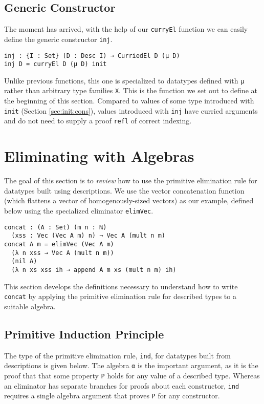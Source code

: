 \documentclass[preprint,nonatbib]{sigplanconf}
\newcommand{\refsec}[1]{Section \ref{sec:#1}}
\begin{document}
\subsection{Generic Constructor}

The moment has arrived, with the help of our {\tt curryEl} function we
can easily define the generic constructor {\tt inj}.

\begin{verbatim}
inj : {I : Set} (D : Desc I) → CurriedEl D (μ D)
inj D = curryEl D (μ D) init
\end{verbatim}

Unlike previous functions, this one is specialized to datatypes
defined with {\tt μ} rather than arbitrary type families {\tt X}. This
is the function we set out to define at the beginning of this section.
Compared to values of some type introduced with {\tt init} (\refsec{init:cons}),
values introduced with {\tt inj} have curried arguments and do not
need to supply a proof {\tt refl} of correct indexing.

\section{Eliminating with Algebras}
\label{sec:ind}

The goal of this section is to {\it review} how to use the primitive
elimination rule for datatypes built using descriptions. We use
the vector concatenation function (which flattens a vector of
homogenously-sized vectors) as our example, defined below using the
specialized eliminator {\tt elimVec}.

\begin{verbatim}
concat : (A : Set) (m n : ℕ)
  (xss : Vec (Vec A m) n) → Vec A (mult n m)
concat A m = elimVec (Vec A m)
  (λ n xss → Vec A (mult n m))
  (nil A)
  (λ n xs xss ih → append A m xs (mult n m) ih)
\end{verbatim}

This section develops the definitions necessary to understand how to
write {\tt concat} by applying the primitive elimination rule for
described types to a suitable algebra.

\subsection{Primitive Induction Principle}

The type of the primitive elimination rule, {\tt ind}, for datatypes built from
descriptions is given below.
The algebra {\tt α} is the important argument, as it is the proof that
that some property {\tt P} holds for any value of a
described type.
Whereas an eliminator
has separate branches for proofs about each constructor, {\tt ind}
requires a single algebra argument that proves {\tt P} for any
constructor.
\end{document}
